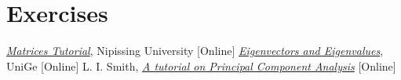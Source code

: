 \section*{Exercises}


\begin{thebibliography}{9}
\href{https://algebra.nipissingu.ca/tutorials/matrices.html}{\emph{Matrices Tutorial}}, Nipissing University [Online]
\href{http://macosa.dima.unige.it/mat/calculus/eigenstuff.htm}{\emph{Eigenvectors and Eigenvalues}}, UniGe [Online]
 L. I. Smith, \href{http://www.iro.umontreal.ca/~pift6080/H09/documents/papers/pca_tutorial.pdf}{\emph{A tutorial on Principal Component Analysis}} [Online]
\end{thebibliography}






